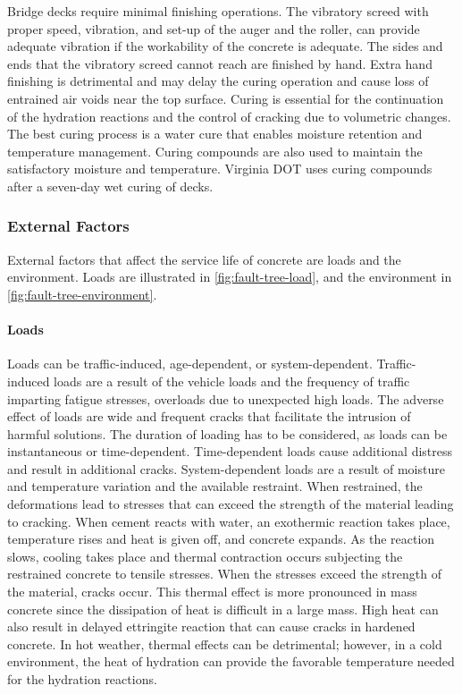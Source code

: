 Bridge decks require minimal finishing operations. The vibratory screed with proper speed, vibration, and set-up of the auger and the roller, can provide adequate vibration if the workability of the concrete is adequate. The sides and ends that the vibratory screed cannot reach are finished by hand. Extra hand finishing is detrimental and may delay the curing operation and cause loss of entrained air voids near the top surface. Curing is essential for the continuation of the hydration reactions and the control of cracking due to volumetric changes. The best curing process is a water cure that enables moisture retention and temperature management. Curing compounds are also used to maintain the satisfactory moisture and temperature. Virginia DOT uses curing compounds after a seven-day wet curing of decks.


\subsubsection{External Factors}
External factors that affect the service life of concrete are loads and the environment. Loads are illustrated in \cref{fig:fault-tree-load}, and the environment in \cref{fig:fault-tree-environment}.

\paragraph{Loads}
Loads can be traffic-induced, age-dependent, or system-dependent. Traffic-induced loads are a result of the
vehicle loads and the frequency of traffic imparting fatigue stresses, overloads due to unexpected high loads. The
adverse effect of loads are wide and frequent cracks that facilitate the intrusion of harmful solutions. The duration of
loading has to be considered, as loads can be instantaneous or time-dependent. Time-dependent loads cause
additional distress and result in additional cracks. System-dependent loads are a result of moisture and temperature
variation and the available restraint. When restrained, the deformations lead to stresses that can exceed the strength
of the material leading to cracking. When cement reacts with water, an exothermic reaction takes place, temperature
rises and heat is given off, and concrete expands. As the reaction slows, cooling takes place and thermal contraction
occurs subjecting the restrained concrete to tensile stresses. When the stresses exceed the strength of the material,
cracks occur. This thermal effect is more pronounced in mass concrete since the dissipation of heat is difficult in a
large mass. High heat can also result in delayed ettringite reaction that can cause cracks in hardened concrete. In
hot weather, thermal effects can be detrimental; however, in a cold environment, the heat of hydration can provide
the favorable temperature needed for the hydration reactions.

